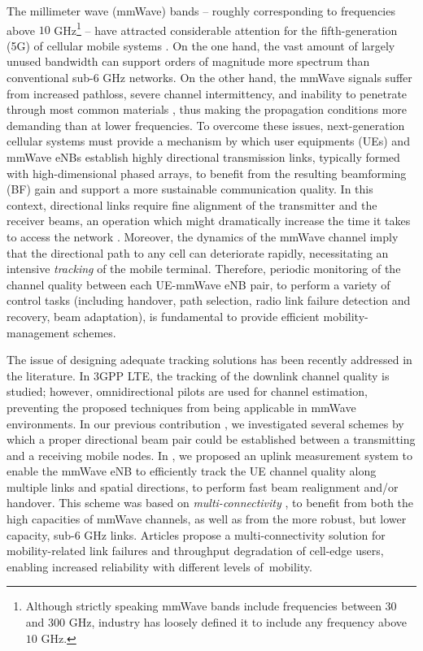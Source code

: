 \documentclass[conference]{IEEEtran}
\begin{document}
The millimeter wave (mmWave) bands -- roughly corresponding to frequencies above $10$ GHz\footnote{Although strictly speaking mmWave bands include frequencies between
$30$ and $300$ GHz,  industry has loosely defined it to include any frequency
above $10$ GHz.} --
have attracted considerable attention for the fifth-generation  (5G) of cellular mobile systems \cite{KhanPi:11-CommMag, Rappaport_WillWork}.
On the one hand, the vast amount of largely unused bandwidth can support orders of magnitude more spectrum than conventional sub-$6$ GHz networks. 
On the other hand, the mmWave signals suffer from increased pathloss, severe channel intermittency, and inability to penetrate through most common materials \cite{Allen:94}, thus making the propagation conditions more demanding than at lower frequencies.
To overcome these issues, next-generation cellular systems must provide a mechanism by which user equipments (UEs) and mmWave eNBs establish highly directional transmission links, typically formed with high-dimensional phased arrays, to benefit from the resulting beamforming (BF) gain and support a more sustainable communication quality.
In this context, directional links require  fine alignment of the transmitter and the receiver beams, an operation which might dramatically increase the time it takes to access the network \cite{Giordani_magazineIA_2016}. 
Moreover, the dynamics of the mmWave channel imply that the directional path to any cell can deteriorate rapidly, necessitating an intensive \emph{tracking} of the mobile terminal\cite{RanRapE:14}.
Therefore, periodic monitoring of the channel quality between each UE-mmWave eNB pair, to perform a variety of control tasks (including handover, path selection, radio link failure detection and recovery, beam adaptation), is fundamental to provide efficient mobility-management schemes.

The issue of designing adequate tracking solutions has been recently addressed in the literature.
In 3GPP LTE, the tracking of the downlink channel quality is studied; however, omnidirectional pilots are used for  channel estimation, preventing the proposed techniques from being applicable in mmWave environments.
In our previous contribution \cite{Giordani_magazineIA_2016}, we investigated several schemes by which a proper directional beam pair could be established between a transmitting and a receiving mobile nodes.
In \cite{giordani_MedHoc2016,giordani2016uplink}, we proposed an uplink measurement system to enable the mmWave eNB to efficiently track the UE channel quality along multiple links and spatial directions, to perform fast beam realignment and/or handover. This scheme was based on \emph{multi-connectivity} \cite{ghosh2014millimeter}, to benefit from both the high capacities of mmWave channels, as well as from the more robust, but lower capacity, sub-6 GHz links.
Articles \cite{chandra2014adaptive, MC} propose a multi-connectivity solution for
mobility-related link failures and throughput degradation of cell-edge users, enabling increased
reliability with different levels of~mobility.
\end{document}
